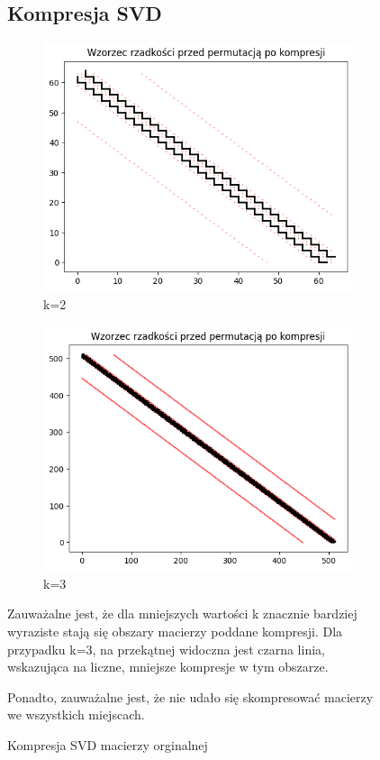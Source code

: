 \documentclass{article}
\begin{document}
\begin{figure}[htbp]
  \subsection{Kompresja SVD}
  \centering
  \begin{subfigure}[b]{0.4\textwidth}
      \includegraphics[width=\linewidth]{img/2bk2.png}
      \caption{k=2}
      \label{fig:obraz1}
  \end{subfigure}
  \hfill
  \begin{subfigure}[b]{0.4\textwidth}
      \includegraphics[width=\linewidth]{img/2bk3.png}
      \caption{k=3}
      \label{fig:obraz2}
  \end{subfigure}
  \caption{Kompresja SVD macierzy orginalnej}
  \label{fig:zestaw_obrazkow}

  \raggedright
  Zauważalne jest, że dla mniejszych wartości k znacznie bardziej wyraziste stają się obszary macierzy poddane kompresji. Dla przypadku k=3, na przekątnej widoczna jest czarna linia, wskazująca na liczne, mniejsze kompresje w tym obszarze.

  Ponadto, zauważalne jest, że nie udało się skompresować macierzy we wszystkich miejscach.
\end{figure}
\end{document}
